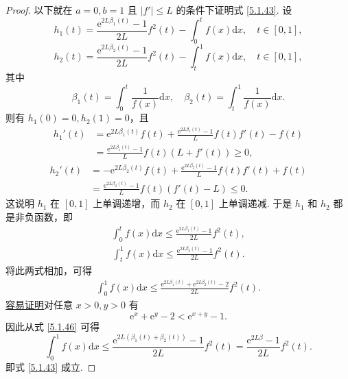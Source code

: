 \documentclass[../../main.tex]{subfiles}
\begin{document}
\begin{proof}
以下就在 $a = 0, b = 1$ 且 $|f'| \leqslant L$ 的条件下证明式 \eqref{5.1.43}. 设
$$h_1(t) = \frac{\mathrm{e}^{2L\beta_1(t)} - 1}{2L} f^2(t) - \int_0^t f(x) \mathrm{d}x, \quad t \in [0,1],$$
$$h_2(t) = \frac{\mathrm{e}^{2L\beta_2(t)} - 1}{2L} f^2(t) - \int_t^1 f(x) \mathrm{d}x, \quad t \in [0,1],$$
其中
$$\beta_1(t) = \int_0^t \frac{1}{f(x)} \mathrm{d}x, \quad \beta_2(t) = \int_t^1 \frac{1}{f(x)} \mathrm{d}x.$$
则有 $h_1(0) = 0, h_2(1) = 0$，且
$$
\begin{aligned}
h_1'(t) &= \mathrm{e}^{2L\beta_1(t)} f(t) + \frac{\mathrm{e}^{2L\beta_1(t)} - 1}{L} f(t) f'(t) - f(t) \\
&= \frac{\mathrm{e}^{2L\beta_1(t)} - 1}{L} f(t) (L + f'(t)) \geqslant 0,
\end{aligned}
$$
$$
\begin{aligned}
h_2'(t) &= -\mathrm{e}^{2L\beta_2(t)} f(t) + \frac{\mathrm{e}^{2L\beta_2(t)} - 1}{L} f(t) f'(t) + f(t) \\
&= \frac{\mathrm{e}^{2L\beta_2(t)} - 1}{L} f(t) (f'(t) - L) \leqslant 0.
\end{aligned}
$$
这说明 $h_1$ 在 $[0,1]$ 上单调递增，而 $h_2$ 在 $[0,1]$ 上单调递减. 于是 $h_1$ 和 $h_2$ 都是非负函数，即
\begin{align}
\int_0^t f(x) \mathrm{d}x \leqslant \frac{\mathrm{e}^{2L\beta_1(t)} - 1}{2L} f^2(t), \label{5.1.44}
\end{align}
\begin{align}
\int_t^1 f(x) \mathrm{d}x \leqslant \frac{\mathrm{e}^{2L\beta_2(t)} - 1}{2L} f^2(t). \label{5.1.45}
\end{align}
将此两式相加，可得
\begin{align}
\int_0^1 f(x) \mathrm{d}x \leqslant \frac{\mathrm{e}^{2L\beta_1(t)} + \mathrm{e}^{2L\beta_2(t)} - 2}{2L} f^2(t). \label{5.1.46}
\end{align}
\hyperref[proposition:常用不等式3]{容易证明}对任意 $x > 0, y > 0$ 有
$$\mathrm{e}^x + \mathrm{e}^y - 2 < \mathrm{e}^{x + y} - 1.$$
因此从式 \eqref{5.1.46} 可得
$$\int_0^1 f(x) \mathrm{d}x \leqslant \frac{\mathrm{e}^{2L(\beta_1(t) + \beta_2(t))} - 1}{2L} f^2(t) = \frac{\mathrm{e}^{2L\beta} - 1}{2L} f^2(t).$$
即式 \eqref{5.1.43} 成立.

\end{proof}
\end{document}
